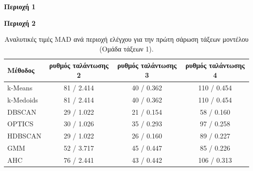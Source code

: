 \begin{table}[htbp]
    \centering
    \caption{Αναλυτικές τιμές MAD ανά περιοχή ελέγχου για την πρώτη σάρωση τάξεων μοντέλου (Ομάδα τάξεων 1).}
    \label{tab:ambdfig:mad}
    \footnotesize
    \setlength{\tabcolsep}{6.5pt}
    \renewcommand{\arraystretch}{1.08}

    \textbf{Περιοχή 1}\\[0.3em]

    \vspace{0.8em}
    \textbf{Περιοχή 2}\\[0.3em]
    \begin{tabular}{lccc}
        \toprule
        Μέθοδος & ρυθμός ταλάντωσης 2 & ρυθμός ταλάντωσης 3 & ρυθμός ταλάντωσης 4 \\
        \midrule
        k-Means   & 81 / 2.414 & 40 / 0.362 & 110 / 0.454 \\
        k-Medoids & 81 / 2.414 & 40 / 0.362 & 110 / 0.454 \\
        DBSCAN    & 29 / 1.022 & 21 / 0.154 &  58 / 0.160 \\
        OPTICS    & 30 / 1.026 & 35 / 0.293 &  97 / 0.258 \\
        HDBSCAN   & 29 / 1.022 & 26 / 0.160 &  89 / 0.227 \\
        GMM       & 52 / 3.717 & 45 / 0.447 &  85 / 0.226 \\
        AHC       & 76 / 2.441 & 43 / 0.442 & 106 / 0.313 \\
        \bottomrule
    \end{tabular}


\end{table}
